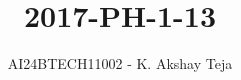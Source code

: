 \documentclass[journal,9pt,onecolumn]{IEEEtran}
\begin{document}

\vspace{3cm}
\title{2017-PH-1-13}
\author{AI24BTECH11002 - K. Akshay Teja}
\maketitle
 \bigskip
{\let\newpage\relax\maketitle}

\renewcommand{\thefigure}{\theenumi}
\renewcommand{\thetable}{\theenumi}
\setlength{\intextsep}{10pt} %

\renewcommand{\thetable}{\theenumi}
\end{document}
